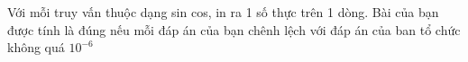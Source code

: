 Với mỗi truy vấn thuộc dạng sin cos, in ra 1 số thực trên 1 dòng. Bài của bạn được tính là đúng nếu mỗi đáp án của bạn chênh lệch với đáp án của ban tổ chức không quá $10^{-6}$